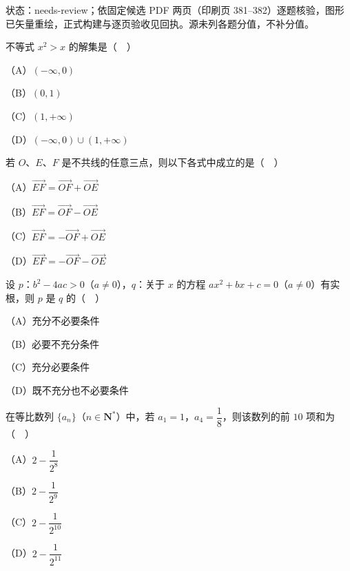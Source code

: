 

状态：needs-review；依固定候选 PDF 两页（印刷页 381–382）逐题核验，图形已矢量重绘，正式构建与逐页验收见回执。源未列各题分值，不补分值。


\begin{question}
不等式 $x^2>x$ 的解集是（　）

（A）$(-\infty,0)$

（B）$(0,1)$

（C）$(1,+\infty)$

（D）$(-\infty,0)\cup(1,+\infty)$

\end{question}
\begin{question}
若 $O$、$E$、$F$ 是不共线的任意三点，则以下各式中成立的是（　）

（A）$\overrightarrow{EF}=\overrightarrow{OF}+\overrightarrow{OE}$

（B）$\overrightarrow{EF}=\overrightarrow{OF}-\overrightarrow{OE}$

（C）$\overrightarrow{EF}=-\overrightarrow{OF}+\overrightarrow{OE}$

（D）$\overrightarrow{EF}=-\overrightarrow{OF}-\overrightarrow{OE}$

\end{question}
\begin{question}
设 $p$：$b^2-4ac>0$（$a\neq0$），$q$：关于 $x$ 的方程 $ax^2+bx+c=0$（$a\neq0$）有实根，则 $p$ 是 $q$ 的（　）

（A）充分不必要条件

（B）必要不充分条件

（C）充分必要条件

（D）既不充分也不必要条件

\end{question}
\begin{question}
在等比数列 $\{a_n\}$（$n\in\mathbf N^*$）中，若 $a_1=1$，$a_4=\dfrac18$，则该数列的前 $10$ 项和为（　）

（A）$2-\dfrac1{2^8}$

（B）$2-\dfrac1{2^9}$

（C）$2-\dfrac1{2^{10}}$

（D）$2-\dfrac1{2^{11}}$

\end{question}

